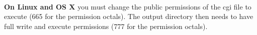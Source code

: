 \paragraph{}
\begin{tcolorbox}[breakable,colback=white,colframe=green,width=\dimexpr\textwidth+12mm\relax,enlarge left by=-6mm,enlarge right by=6mm]
\textbf{On Linux and OS X} you must change the public permissions of the cgi file to execute (665 for the permission octals).  The output directory then needs to have full write and execute permissions (777 for the permission octals).
\end{tcolorbox}


